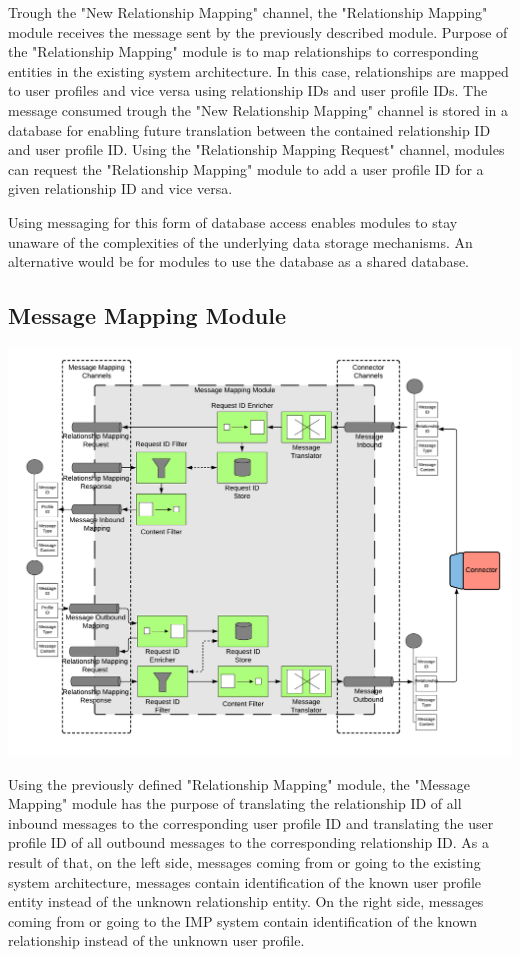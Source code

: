Trough the "New Relationship Mapping" channel, the "Relationship Mapping" module receives the message sent by the previously described module. Purpose of the "Relationship Mapping" module is to map relationships to corresponding entities in the existing system architecture. In this case, relationships are mapped to user profiles and vice versa using relationship IDs and user profile IDs. The message consumed trough the "New Relationship Mapping" channel is stored in a database for enabling future translation between the contained relationship ID and user profile ID. Using the "Relationship Mapping Request" channel, modules can request the "Relationship Mapping" module to add a user profile ID for a given relationship ID and vice versa.

Using messaging for this form of database access enables modules to stay unaware of the complexities of the underlying data storage mechanisms. An alternative would be for modules to use the database as a shared database.

\subsection{Message Mapping Module}

\begin{center}
    \includegraphics[scale=0.6]{Diagrams/Integration Architecture 1/Technological Integration/10. Message Mapping Module.pdf}
\end{center}

Using the previously defined "Relationship Mapping" module, the "Message Mapping" module has the purpose of translating the relationship ID of all inbound messages to the corresponding user profile ID and translating the user profile ID of all outbound messages to the corresponding relationship ID. As a result of that, on the left side, messages coming from or going to the existing system architecture, messages contain identification of the known user profile entity instead of the unknown relationship entity. On the right side, messages coming from or going to the IMP system contain identification of the known relationship instead of the unknown user profile.

